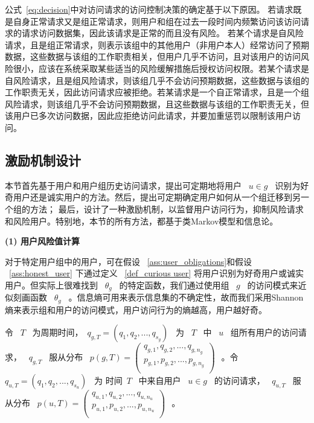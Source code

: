 公式~\ref{eq:decision}中对访问请求的访问控制决策的确定基于以下原因。 若请求既是自身正常请求又是组正常请求，则用户和组在过去一段时间内频繁访问该访问请求的请求访问数据集，因此该请求是正常的而且没有风险。 若某个请求是自风险请求，且是组正常请求，则表示该组中的其他用户（非用户本人）经常访问了预期数据，这些数据与该组的工作职责相关，但用户几乎不访问，且对该用户的访问风险很小，应该在系统采取某些适当的风险缓解措施后授权访问权限。若某个请求是自风险请求，且是组风险请求，则该组几乎不会访问预期数据，这些数据与该组的工作职责无关，因此访问请求应被拒绝。若某请求是一个自正常请求，且是一个组风险请求，则该组几乎不会访问预期数据，且这些数据与该组的工作职责无关，但该用户已多次访问数据，因此应拒绝访问此请求，并要加重惩罚以限制该用户访问。


\subsection{激励机制设计}
\label{subsec:User classification and incentive mechanism}

本节首先基于用户和用户组历史访问请求，提出可定期地将用户 ~$u \in g$~ 识别为好奇用户还是诚实用户的方法。然后，提出可定期确定用户如何从一个组迁移到另一个组的方法； 最后，设计了一种激励机制，以监督用户访问行为，抑制风险请求和风险用户。特别地，本节的所有方法，都基于类Markov模型和信息论。

\textbf{(1) 用户风险值计算}

对于特定用户组中的用户，可在假设 ~\ref{ass:user_obligations}和假设 ~\ref{ass:honest_user} 下通过定义 ~\ref{def_curious user} 将用户识别为好奇用户或诚实用户。但实际上很难找到 ~$\theta_g$~ 的特定函数，我们通过使用组 ~$g$~ 的访问模式来近似刻画函数 ~$\theta_g$~ 。信息熵可用来表示信息集的不确定性，故而我们采用Shannon熵来表示组和用户的访问模式，用户访问行为的熵越高，用户越好奇。

令 ~$T$~ 为周期时间，~$q_{g,T}=(q_1, q_2,...,q_{s_g})$~ 为 ~$T$~ 中 ~$u$~ 组所有用户的访问请求， ~$q_{g,T}$~ 服从分布
~$p(g,T)=
(
\begin{array}{l}
q_{g,1},  q_{g,2}, ...,q_{g,n_g}\\
p_{g,1},  p_{g,2}, ...,p_{g,n_g}\\
\end{array}
)
~$~。令 ~$q_{u,T}=(q_1, q_2,...,q_{s_u})$~ 为 时间~$T$~ 中来自用户 ~$u \in g$~ 的访问请求， ~$q_{u,T}$~ 服从分布
~$p(u,T)=
(
\begin{array}{l}
q_{u,1},  q_{u,2}, ...,q_{u,n_u}\\
p_{u,1},  p_{u,2}, ...,p_{u,n_u}\\
\end{array}
)
~$~。

